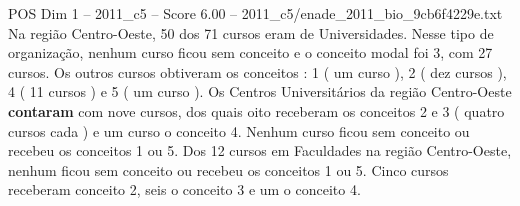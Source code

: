 \begin{textsample}{POS Dim 1 – 2011\_c5 – Score 6.00 – 2011\_c5/enade\_2011\_bio\_9cb6f4229e.txt}
Na região Centro-Oeste, 50 dos 71 cursos eram de Universidades.
Nesse tipo de organização, nenhum curso ficou sem conceito e o conceito modal foi 3, com 27 cursos.
Os outros cursos obtiveram os conceitos : 1 ( um curso ), 2 ( dez cursos ), 4 ( 11 cursos ) e 5 ( um curso ).
Os Centros Universitários da região Centro-Oeste \textbf{contaram} com nove cursos, dos quais oito receberam os conceitos 2 e 3 ( quatro cursos cada ) e um curso o conceito 4.
Nenhum curso ficou sem conceito ou recebeu os conceitos 1 ou 5.
Dos 12 cursos em Faculdades na região Centro-Oeste, nenhum ficou sem conceito ou recebeu os conceitos 1 ou 5.
Cinco cursos receberam conceito 2, seis o conceito 3 e um o conceito 4.

\end{textsample}
